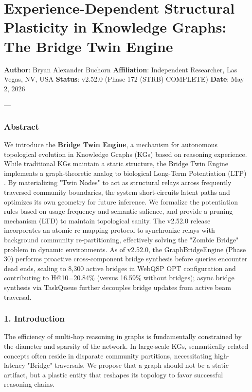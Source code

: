 \section{Experience-Dependent Structural Plasticity in Knowledge Graphs: The Bridge Twin Engine}

\textbf{Author}: Bryan Alexander Buchorn  
\textbf{Affiliation}: Independent Researcher, Las Vegas, NV, USA  
\textbf{Status}: v2.52.0 (Phase 172 (STRB) COMPLETE)
\textbf{Date}: May 2, 2026

---

\subsubsection{Abstract}
We introduce the \textbf{Bridge Twin Engine}, a mechanism for autonomous topological evolution in Knowledge Graphs (KGs) based on reasoning experience. While traditional KGs maintain a static structure, the Bridge Twin Engine implements a graph-theoretic analog to biological Long-Term Potent\-iation (LTP) \cite{hebb1949, bipoo1998}. By mater\-ializing "Twin Nodes" to act as structural relays across frequently traversed community boundaries, the system short-circuits latent paths and optimizes its own geometry for future inference. We formalize the poten\-tiation rules based on usage frequency and semantic salience, and provide a pruning mechanism (LTD) to maintain topological sanity. The v2.52.0 release incor\-porates an atomic re-mapping protocol to synchronize relays with background community re-parti\-tioning, effectively solving the "Zombie Bridge" problem in dynamic envir\-onments. As of v2.52.0, the GraphBridgeEngine (Phase 30) performs proactive cross-component bridge synthesis before queries encounter dead ends, scaling to 8,300 active bridges in WebQSP OPT confi\-guration and contr\-ibuting to H@10=20.84\% (versus 16.59\% without bridges); async bridge synthesis via TaskQueue further decouples bridge updates from active beam traversal.

\subsubsection{1. Introd\-uction}
The efficiency of multi-hop reasoning in graphs is funda\-mentally constrained by the diameter and sparsity of the network. In large-scale KGs, seman\-tically related concepts often reside in disparate community partitions, neces\-sitating high-latency "Bridge" traversals. We propose that a graph should not be a static artifact, but a plastic entity that reshapes its topology to favor successful reasoning chains.

